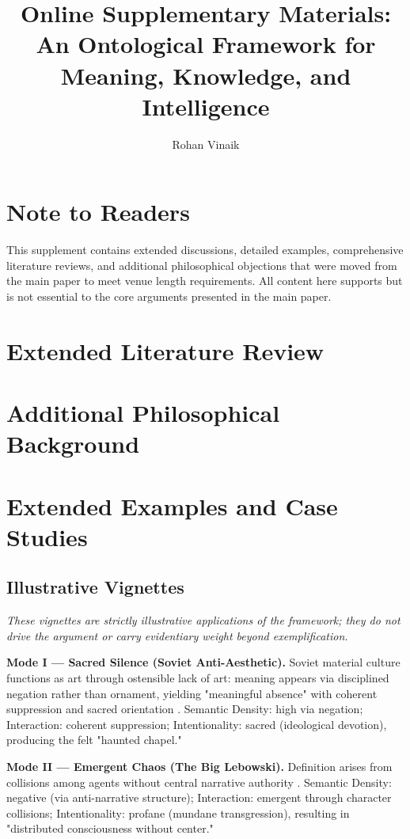 \documentclass[12pt]{article}
\title{Online Supplementary Materials:\\
An Ontological Framework for Meaning, Knowledge, and Intelligence}
\author{Rohan Vinaik}
\date{}
\begin{document}
\maketitle

\section*{Note to Readers}
This supplement contains extended discussions, detailed examples, comprehensive literature reviews, and additional philosophical objections that were moved from the main paper to meet venue length requirements. All content here supports but is not essential to the core arguments presented in the main paper.

\section{Extended Literature Review}

\section{Additional Philosophical Background}

\section{Extended Examples and Case Studies}

\subsection{Illustrative Vignettes}

\textit{These vignettes are strictly illustrative applications of the framework; they do not drive the argument or carry evidentiary weight beyond exemplification.}

\textbf{Mode I — Sacred Silence (Soviet Anti-Aesthetic).} Soviet material culture functions as art through ostensible lack of art: meaning appears via disciplined negation rather than ornament, yielding "meaningful absence" with coherent suppression and sacred orientation \citep{groys1992total}. Semantic Density: high via negation; Interaction: coherent suppression; Intentionality: sacred (ideological devotion), producing the felt "haunted chapel."

\textbf{Mode II — Emergent Chaos (The Big Lebowski).} Definition arises from collisions among agents without central narrative authority \citep{coen1998lebowski}. Semantic Density: negative (via anti-narrative structure); Interaction: emergent through character collisions; Intentionality: profane (mundane transgression), resulting in "distributed consciousness without center."
\end{document}
